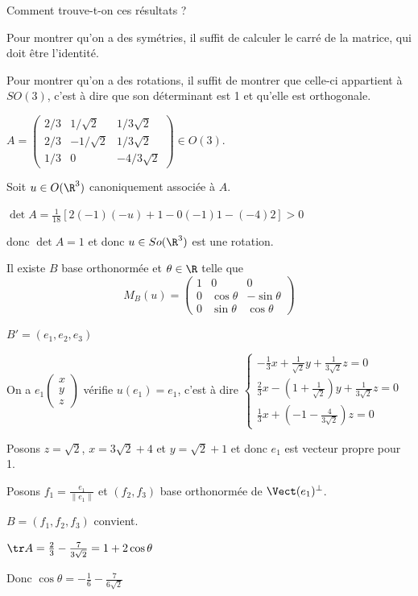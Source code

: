 \lvspace 

Comment trouve-t-on ces résultats ? 

Pour montrer qu'on a des symétries, il suffit de calculer le carré de la matrice, qui doit 
être l'identité.

Pour montrer qu'on a des rotations, il suffit de montrer que celle-ci appartient à $SO(3)$, 
c'est à dire que son déterminant est 1 et qu'elle est orthogonale.


\begin{exemple}
    $A = \begin{pmatrix}
        2/3 & 1/\sqrt 2 & 1/3 \sqrt 2 \\
        2 / 3 & - 1 / \sqrt 2 & 1/3 \sqrt 2\\
        1 / 3 & 0 & -4 / 3 \sqrt 2 
    \end{pmatrix} \in O(3)$. 

    Soit $u \in O(\R^3)$ canoniquement associée à $A$. 

    $\det A = \frac 1 {18} \left[ 2(-1)(-u) + 1 - 0(-1)1 - (-4)2\right] > 0$

    donc $\det A = 1$ et donc $u \in So(\R^3)$ est une rotation. 

    Il existe $B$ base orthonormée et $\theta \in \R$ telle que 
    $$M_B(u) = \begin{pmatrix}
        1 & 0 & 0 \\
        0 & \cos \theta & -\sin \theta \\
        0 & \sin \theta & \cos \theta
        \end{pmatrix}$$

    $B' = (e_1, e_2, e_3)$ 

    On a $e_1 \begin{pmatrix}
        x \\ y \\ z
    \end{pmatrix}$ vérifie $u(e_1) = e_1$, c'est à dire 
    $\begin{cases}
        -\frac 1 3x + \frac 1 {\sqrt 2} y + \frac 1 {3 \sqrt 2} z = 0 \\
        \frac 2 3 x -( 1 + \frac 1 {\sqrt 2}) y + \frac 1 {3 \sqrt 2} z = 0 \\
        \frac 1 3x + (- 1 - \frac 4 {3 \sqrt 2}) z = 0
    \end{cases}$

    Posons $z = \sqrt 2$, $x = 3 \sqrt 2 + 4$ et $y = \sqrt 2 +1$ et 
    donc $e_1$ est vecteur propre pour 1. 

    Posons $f_1 = \frac{e_1}{\| e_1 \|}$ et $(f_2, f_3)$ base orthonormée de $\Vect(e_1)^\perp$.

    $B = (f_1, f_2, f_3)$ convient. 

    $\tr A = \frac 2 3 - \frac 7 {3 \sqrt 2} = 1 + 2 \cos \theta$

    Donc $\cos \theta = - \frac 1 6 - \frac 7 {6 \sqrt 2}$
\end{exemple}

